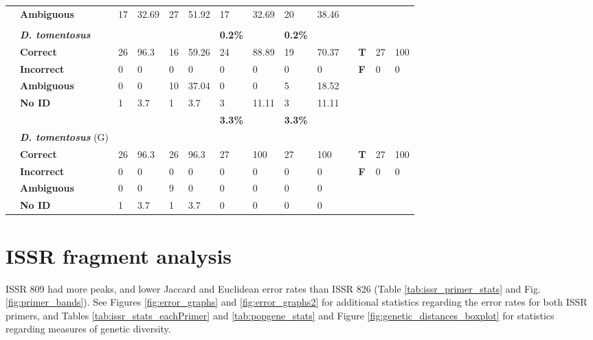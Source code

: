 \begin{landscape}
\begin{table}[!htp]
{\begin{tabular}{@{}llllllllllllll@{}}
 & \textbf{Ambiguous} & 17 & 32.69 & 27 & 51.92 & 17 & 32.69 & 20 & 38.46 &  & \textbf{} &  &  \\ \\
 & \textit{\textbf{D. tomentosus}} &  &  &  &  & \textbf{0.2\%} &  & \textbf{0.2\%} &  &  &  &  &  \\
 & \textbf{Correct} & 26 & 96.3 & 16 & 59.26 & 24 & 88.89 & 19 & 70.37 &  & \textbf{T} & 27 & 100 \\
 & \textbf{Incorrect} & 0 & 0 & 0 & 0 & 0 & 0 & 0 & 0 &  & \textbf{F} & 0 & 0 \\
 & \textbf{Ambiguous} & 0 & 0 & 10 & 37.04 & 0 & 0 & 5 & 18.52 &  & \textbf{} &  &  \\
 & \textbf{No ID} & 1 & 3.7 & 1 & 3.7 & 3 & 11.11 & 3 & 11.11 &  &  &  &  \\
 &  &  &  &  &  & \textbf{3.3\%} &  & \textbf{3.3\%} &  &  &  &  &  \\
 & \textit{\textbf{D. tomentosus}} (G) &  &  &  &  &  &  &  &  &  &  &  &  \\
& \textbf{Correct} & 26 & 96.3 & 26 & 96.3 & 27 & 100 & 27 & 100 &  & \textbf{T} & 27 & 100 \\
 & \textbf{Incorrect} & 0 & 0 & 0 & 0 & 0 & 0 & 0 & 0 &  & \textbf{F} & 0 & 0 \\
 & \textbf{Ambiguous} & 0 & 0 & 9 & 0 & 0 & 0 & 0 & 0 &  &  &  &  \\
 & \textbf{No ID} & 1 & 3.7 & 1 & 3.7 & 0 & 0 & 0 & 0 &  &  &  &  \\ \bottomrule
\end{tabular}
}
\end{table}
\end{landscape}

\clearpage

\section{ISSR fragment analysis}
\label{sec:issrs}

ISSR 809 had more peaks, and lower Jaccard and Euclidean error rates than ISSR 826 (Table \ref{tab:issr_primer_stats} and Fig. \ref{fig:primer_bands}). See Figures \ref{fig:error_graphs} and \ref{fig:error_graphs2} for additional statistics regarding the error rates for both ISSR primers, and Tables \ref{tab:issr_stats_eachPrimer} and \ref{tab:popgene_stats} and Figure \ref{fig:genetic_distances_boxplot} for statistics regarding measures of genetic diversity.

